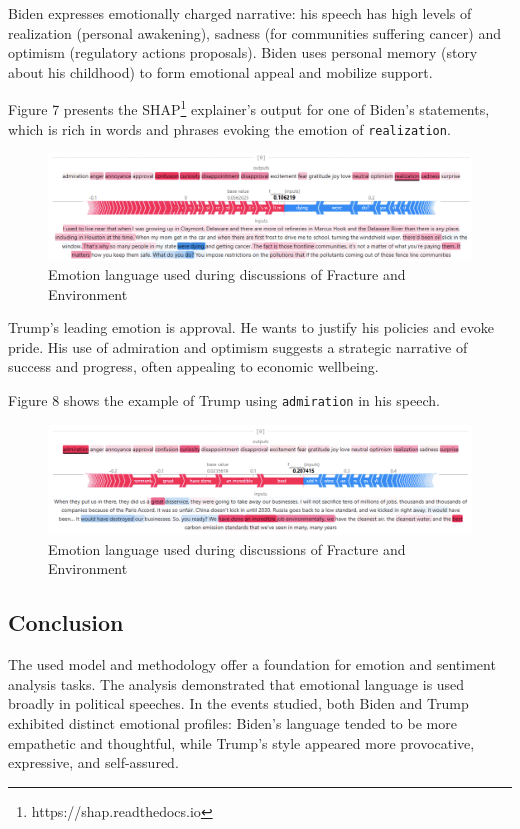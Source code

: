 \documentclass[pdflatex,sn-mathphys-num]{sn-jnl}%
\begin{document}
Biden expresses emotionally charged narrative: his speech has high levels of realization (personal awakening), sadness (for communities suffering cancer) and optimism (regulatory actions proposals). Biden uses personal memory (story about his childhood) to form emotional appeal and mobilize support.

Figure 7 presents the SHAP\footnote{https://shap.readthedocs.io} explainer’s output for one of Biden’s statements, which is rich in words and phrases evoking the emotion of \texttt{realization}.

\begin{figure}[H]
	\centering
	\includegraphics[width=12cm]{f7-explainer_realization.png}
	\caption{Emotion language used during discussions of Fracture and Environment}
\end{figure}

Trump's leading emotion is approval. He wants to justify his policies and evoke pride. His use of admiration and optimism suggests a strategic narrative of success and progress, often appealing to economic wellbeing.

Figure 8 shows the example of Trump using \texttt{admiration} in his speech.

\begin{figure}[H]
	\centering
	\includegraphics[width=12cm]{f8-explainer_admiration.png}
	\caption{Emotion language used during discussions of Fracture and Environment}
\end{figure}

\subsection{Conclusion}

The used model and methodology offer a foundation for emotion and sentiment analysis tasks.
The analysis demonstrated that emotional language is used broadly in political speeches. In the events studied, both Biden and Trump exhibited distinct emotional profiles: Biden’s language tended to be more empathetic and thoughtful, while Trump’s style appeared more provocative, expressive, and self-assured.\\
\end{document}

